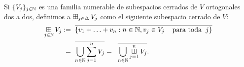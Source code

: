\QEDB
\vspace{0.2cm}


\begin{defi}
Si $\{ V_{j} \}_{j \in \mathbb{N}}$ es una familia 
numerable de subespacios cerrados
de $V$ ortogonales dos a dos, definimos
a $\operatorname*{{\boxplus}}_{j \in \Delta} V_{j}$ como el siguiente
subespacio cerrado de $V$:
\begin{align*}
\operatorname*{{\boxplus}}_{j \in \mathbb{N}} V_{j} := & \hspace{0.2cm}
\overline{\{ v_{1}+ \ldots + v_{n} :
n \in \mathbb{N}, v_{j} \in V_{j}
\hspace{0.4cm} \text{para toda} \hspace{0.2cm} j \}} \\
= & \hspace{0.2cm} \overline{\bigcup\limits_{n \in \mathbb{N}}^{}{\sum\limits_{j=1}^{n}V_{j}}}
= \hspace{0.2cm} \overline{\bigcup\limits_{n \in \mathbb{N}}^{}{\operatorname*{{\boxplus}}_{j=1}^{n} V_{j}}} .
\end{align*}
\end{defi}


